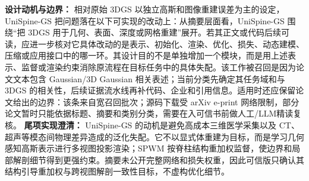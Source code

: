 \textbf{设计动机与边界：} 相对原始 3DGS 以独立高斯和图像重建误差为主的设定，UniSpine-GS 把问题落在以下可实现的改动上：从摘要层面看，UniSpine-GS 围绕“把 3DGS 用于几何、表面、深度或网格重建”展开。若其正文或代码后续可读，应进一步核对它具体改动的是表示、初始化、渲染、优化、损失、动态建模、压缩或应用接口中的哪一环。其设计目的不是单独增加一个模块，而是用上述表示、监督或渲染约束消除原流程在目标任务中的具体失配。该工作被召回是因为论文文本包含 Gaussian/3D Gaussian 相关表述；当前分类先确定其任务域和与 3DGS 的相关性，后续证据流水线再补代码、企业和引用信息。适用时还应保留论文给出的边界：该条来自宽召回批次；源码下载受 arXiv e-print 网络限制，部分论文暂时只能依据标题、摘要和类别分类，需要在入可信书前做人工/LLM精读复核。
\textbf{尾项实现澄清：} UniSpine-GS 的动机是避免高成本三维医学采集以及 CT、超声等模态间物理差异造成的泛化失配。它不以显式体重建为目标，而是学习几何感知高斯表示进行多视图投影渲染；SPWM 按脊柱结构重加权监督，使边界和局部解剖细节得到更强约束。摘要未公开完整网络和损失权重，因此可信版只确认其结构引导重加权与跨视图解剖一致性目标，不虚构优化细节。
